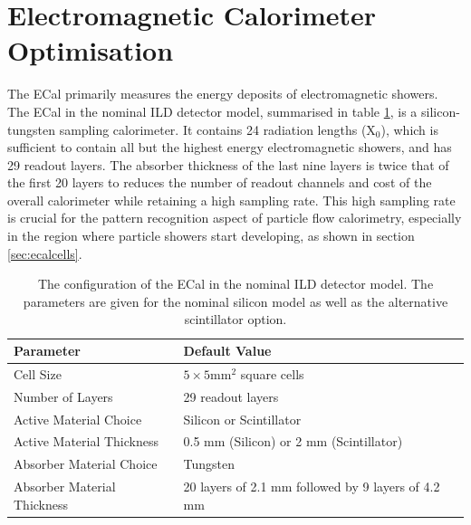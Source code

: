 
\section{Electromagnetic Calorimeter Optimisation}
\label{sec:ecal}
The ECal primarily measures the energy deposits of electromagnetic showers.  The ECal in the nominal ILD detector model, summarised in table \ref{table:defaultildecal}, is a silicon-tungsten sampling calorimeter.  It contains 24 radiation lengths ($\text{X}_{0}$), which is sufficient to contain all but the highest energy electromagnetic showers, and has 29 readout layers.  The absorber thickness of the last nine layers is twice that of the first 20 layers to reduces the number of readout channels and cost of the overall calorimeter while retaining a high sampling rate.  This high sampling rate is crucial for the pattern recognition aspect of particle flow calorimetry, especially in the region where particle showers start developing, as shown in section \ref{sec:ecalcells}.  

\begin{table}[h!]
\centering
\begin{tabular}{ l l}
\hline
Parameter & Default Value \\
\hline
Cell Size & $5 \times 5 \text{mm}^{2}$ square cells \\
Number of Layers & 29 readout layers \\
Active Material Choice & Silicon or Scintillator  \\
Active Material Thickness & 0.5 mm (Silicon) or 2 mm (Scintillator)  \\
Absorber Material Choice & Tungsten \\
Absorber Material Thickness & 20 layers of 2.1 mm followed by 9 layers of 4.2 mm \\
\hline
\end{tabular}
\caption[The configuration of the ECal in the nominal ILD detector model.  The parameters are given for the nominal silicon model as well as the alternative scintillator option.]{The configuration of the ECal in the nominal ILD detector model.  The parameters are given for the nominal silicon model as well as the alternative scintillator option.}
\label{table:defaultildecal}
\end{table}

